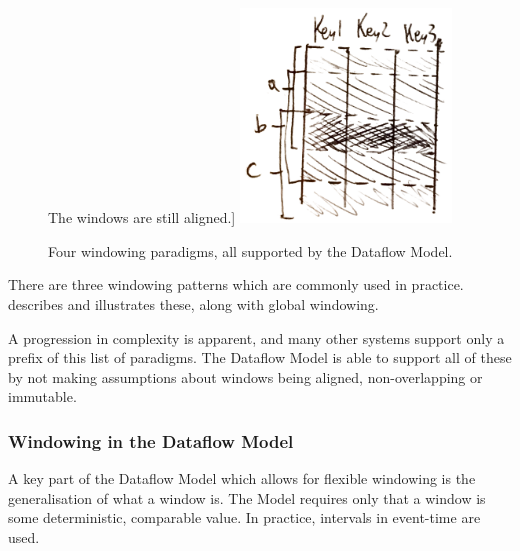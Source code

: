 \begin{figure}[h]
The windows are still aligned.]{
		\includegraphics[width=0.5\textwidth]{images/temp/window-type-sliding}
	}
	\caption{Four windowing paradigms, all supported by the Dataflow Model.}
	\label{fig:prep:window-types}
\end{figure}

There are three windowing patterns which are commonly used in practice.
 describes and illustrates these, along with global windowing.

A progression in complexity is apparent, and many other systems support only a prefix of this list of paradigms.
The Dataflow Model is able to support all of these by not making assumptions about windows being aligned, non-overlapping or immutable.

\subsubsection{Windowing in the Dataflow Model}
A key part of the Dataflow Model which allows for flexible windowing is the generalisation of what a window is.
The Model requires only that a window is some deterministic, comparable value.
In practice, intervals in event-time are used.

